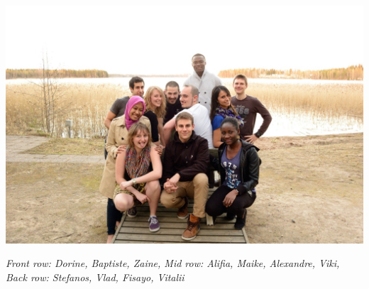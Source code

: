 \documentclass[10pt,a4paper]{article} %
\begin{document}
\begin{center}
	\vspace{10pt}
	\includegraphics[width=1\linewidth]{media/perccom_family.jpg} %
	\vspace{10pt}
		\par\textit{Front row: Dorine, Baptiste, Zaine, Mid row: Alifia, Maike, Alexandre, Viki, Back row: Stefanos, Vlad, Fisayo, Vitalii}
\end{center}
\end{document}
